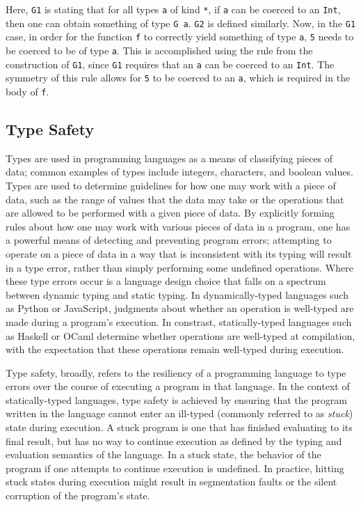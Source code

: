 \documentclass{sig-alternate}
\begin{document}
Here, \texttt{G1} is stating that for all types \texttt{a} of kind \texttt{*}, if \texttt{a} can be coerced to an \texttt{Int}, then one can obtain something of type \texttt{G a}. \texttt{G2} is defined similarly. Now, in the \texttt{G1} case, in order for the function \texttt{f} to correctly yield something of type \texttt{a}, \texttt{5} needs to be coerced to be of type \texttt{a}. This is accomplished using the rule from the construction of \texttt{G1}, since \texttt{G1} requires that an \texttt{a} can be coerced to an \texttt{Int}. The symmetry of this rule allows for \texttt{5} to be coerced to an \texttt{a}, which is required in the body of \texttt{f}. 

\subsection{Type Safety}
\label{sec:background-type-safety}

Types are used in programming languages as a means of classifying pieces of data; common examples of types include integers, characters, and boolean values. Types are used to determine guidelines for how one may work with a piece of data, such as the range of values that the data may take or the operations that are allowed to be performed with a given piece of data. By explicitly forming rules about how one may work with various pieces of data in a program, one has a powerful means of detecting and preventing program errors; attempting to operate on a piece of data in a way that is inconsistent with its typing will result in a type error, rather than simply performing some undefined operations. Where these type errors occur is a language design choice that falls on a spectrum between dynamic typing and static typing. In dynamically-typed languages such as Python or JavaScript, judgments about whether an operation is well-typed are made during a program's execution. In constrast, statically-typed languages such as Haskell or OCaml determine whether operations are well-typed at compilation, with the expectation that these operations remain well-typed during execution. 

Type safety, broadly, refers to the resiliency of a programming language to type errors over the course of executing a program in that language. In the context of statically-typed languages, type safety is achieved by ensuring that the program written in the language cannot enter an ill-typed (commonly referred to as {\em stuck}) state during execution. A stuck program is one that has finished evaluating to its final result, but has no way to continue execution as defined by the typing and evaluation semantics of the language. In a stuck state, the behavior of the program if one attempts to continue execution is undefined. In practice, hitting stuck states during execution might result in segmentation faults or the silent corruption of the program's state.
\end{document}
